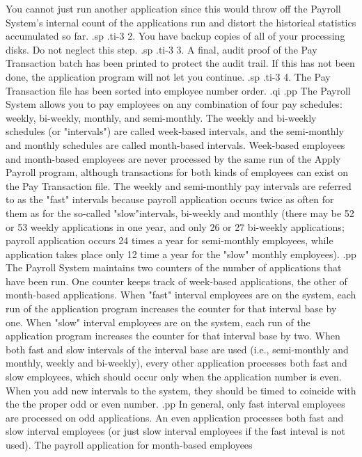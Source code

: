You cannot just run another application since this would
throw off the Payroll System's internal count of the applications run
and distort the historical statistics accumulated so far.
.sp
.ti-3
2. You have backup copies of all of your processing disks.  Do not
neglect this step.
.sp
.ti-3
3. A final, audit proof of the Pay Transaction batch has been printed
to protect the audit trail.
If this has not been done, the application program will not let you
continue.
.sp
.ti-3
4. The Pay Transaction file has been sorted into employee number
order.
.qi
.pp
The Payroll System allows you to pay employees on any combination of
four pay schedules: weekly, bi-weekly, monthly, and semi-monthly.
The weekly and bi-weekly schedules (or "intervals") are called week-based
intervals, and the semi-monthly and monthly schedules are called
month-based intervals.	Week-based employees and month-based employees
are never processed by the same run of the Apply Payroll program,
although transactions for both kinds of employees can exist on the
Pay Transaction file.  The weekly and semi-monthly pay intervals are
referred to as the "fast" intervals because payroll application occurs
twice as often for them as for the so-called "slow"intervals, bi-weekly
and monthly (there may be 52 or 53 weekly applications in one year, and
only 26 or 27 bi-weekly applications; payroll application occurs 24 times
a year for semi-monthly employees, while application takes place only
12 time a year for the "slow" monthly employees).
.pp
The Payroll System maintains two counters of the number of
applications that have been run.  One counter keeps track of week-based
applications, the other of month-based applications.  When "fast"
interval employees are on the system, each run of the application program
increases the counter for that interval base by one.  When "slow" interval
employees are on the system, each run of the application program increases
the counter for that interval base by two.  When both fast and slow intervals
of the interval base are used (i.e., semi-monthly and monthly, weekly and
bi-weekly), every other application processes both fast and slow employees,
which should occur only when the application number is even. When you add
new intervals to the system, they should be timed to coincide with the
the proper odd or even number.
.pp
In general, only fast interval employees are processed on odd applications.
An even application processes both fast and slow interval employees (or
just slow interval employees if the fast inteval is not used).	The
payroll application for month-based employees
